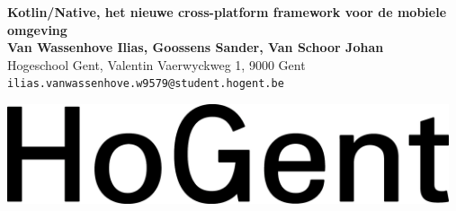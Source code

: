 \documentclass[a0,portrait]{a0poster}
\begin{document}


\begin{minipage}[t]{0.75\linewidth}
\VeryHuge \color{HoGentAccent1} \textbf{Kotlin/Native, het nieuwe cross-platform framework voor de mobiele omgeving} \color{Black}\\ %
\huge \textbf{Van Wassenhove Ilias, Goossens Sander, Van Schoor Johan}\\[0.5cm] %
\huge Hogeschool Gent, Valentin Vaerwyckweg 1, 9000 Gent\\[0.4cm] %
\Large \texttt{ilias.vanwassenhove.w9579@student.hogent.be} \\
\end{minipage}
%
\begin{minipage}[t]{0.25\linewidth}
\includegraphics[width=13cm,right]{figures/HG-woordmerk.jpg} 

\end{minipage}

\vspace{1cm} %

\end{document}

